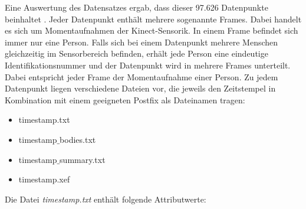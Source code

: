 Eine Auswertung des Datensatzes ergab, dass dieser 97.626 Datenpunkte beinhaltet \citep{temiz_konzeption_2022}.
Jeder Datenpunkt enthält mehrere sogenannte Frames.
Dabei handelt es sich um Momentaufnahmen der Kinect-Sensorik.
In einem Frame befindet sich immer nur eine Person.
Falls sich bei einem Datenpunkt mehrere Menschen gleichzeitig im Sensorbereich befinden,
erhält jede Person eine eindeutige Identifikationsnummer
und der Datenpunkt wird in mehrere Frames unterteilt.
Dabei entspricht jeder Frame der Momentaufnahme einer Person.
Zu jedem Datenpunkt liegen verschiedene Dateien vor,
die jeweils den Zeitstempel in Kombination mit einem geeigneten Postfix als Dateinamen tragen:
\begin{itemize}
  \item timestamp.txt
  \item timestamp$\_$bodies.txt
  \item timestamp$\_$summary.txt
  \item timestamp.xef
\end{itemize}
Die Datei \emph{timestamp.txt} enthält folgende Attributwerte:
